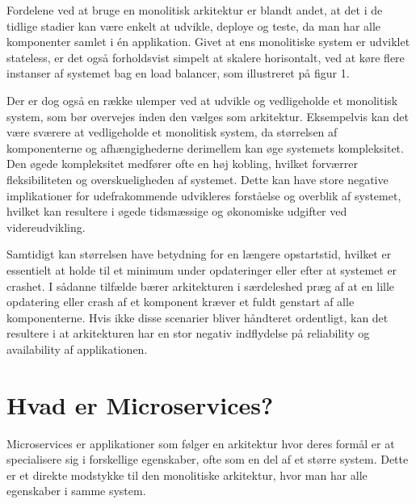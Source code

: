 \documentclass{article}
\begin{document}
\begin{flushleft}
Fordelene ved at bruge en monolitisk arkitektur er blandt andet, at det i de tidlige stadier kan være enkelt at udvikle, deploye og teste, da man har alle komponenter samlet i én applikation.\cite{mono1} Givet at ens monolitiske system er udviklet stateless, er det også forholdsvist simpelt at skalere horisontalt, ved at køre flere instanser af systemet bag en load balancer, som illustreret på figur 1.\cite{mono2} \linebreak

Der er dog også en række ulemper ved at udvikle og vedligeholde et monolitisk system, som bør overvejes inden den vælges som arkitektur. Eksempelvis kan det være sværere at vedligeholde et monolitisk system, da størrelsen af komponenterne og afhængighederne derimellem kan øge systemets kompleksitet. Den øgede kompleksitet medfører ofte en høj kobling, hvilket forværrer fleksibiliteten og overskueligheden af systemet.\cite{mono3} Dette kan have store negative implikationer for udefrakommende udvikleres forståelse og overblik af systemet, hvilket kan resultere i øgede tidsmæssige og økonomiske udgifter ved videreudvikling.\cite{mono4} \linebreak

Samtidigt kan størrelsen have betydning for en længere opstartstid, hvilket er essentielt at holde til et minimum under opdateringer eller efter at systemet er crashet. I sådanne tilfælde bærer arkitekturen i særdeleshed præg af at en lille opdatering eller crash af et komponent kræver et fuldt genstart af alle komponenterne.\cite{mono5} Hvis ikke disse scenarier bliver håndteret ordentligt, kan det resultere i at arkitekturen har en stor negativ indflydelse på reliability og availability af applikationen.

\section*{Hvad er Microservices?}

Microservices er applikationer som følger en arkitektur hvor deres formål er at specialisere sig i forskellige egenskaber, ofte som en del af et større system. Dette er et direkte modstykke til den monolitiske arkitektur, hvor man har alle egenskaber i samme system.\linebreak


\end{flushleft}
\end{document}

